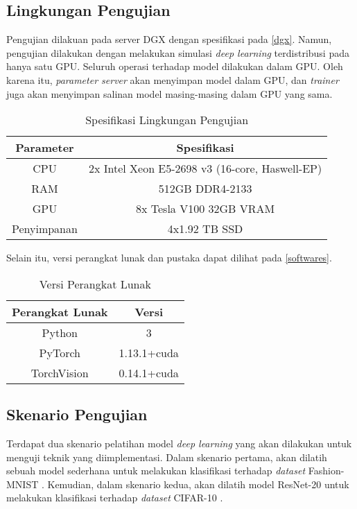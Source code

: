 \subsection{Lingkungan Pengujian}
Pengujian dilakuan pada server DGX dengan spesifikasi pada \autoref{dgx}. Namun, pengujian dilakukan dengan melakukan simulasi \emph{deep learning} terdistribusi pada hanya satu GPU. Seluruh operasi terhadap model dilakukan dalam GPU. Oleh karena itu, \emph{parameter server} akan menyimpan model dalam GPU, dan \emph{trainer} juga akan menyimpan salinan model masing-masing dalam GPU yang sama.

\begin{table}[H]
  \caption{Spesifikasi Lingkungan Pengujian}\label{dgx}
  \centering
  \begin{tabular}{ | c | c | }
    \hline
    \textbf{Parameter} & \textbf{Spesifikasi}                           \\
    \hline
    CPU                & 2x Intel Xeon E5-2698 v3 (16-core, Haswell-EP) \\
    \hline
    RAM                & 512GB DDR4-2133                                \\
    \hline
    GPU                & 8x Tesla V100 32GB VRAM                        \\
    \hline
    Penyimpanan        & 4x1.92 TB SSD                                  \\
    \hline
  \end{tabular}
\end{table}

Selain itu, versi perangkat lunak dan pustaka dapat dilihat pada \autoref{softwares}.
\begin{table}[H]
  \caption{Versi Perangkat Lunak}\label{softwares}
  \centering
  \begin{tabular}{ | c | c | }
    \hline
    \textbf{Perangkat Lunak} & \textbf{Versi} \\
    \hline
    Python                   & 3              \\
    \hline
    PyTorch                  & 1.13.1+cuda    \\
    \hline
    TorchVision              & 0.14.1+cuda    \\
    \hline
  \end{tabular}
\end{table}

\subsection{Skenario Pengujian}
Terdapat dua skenario pelatihan model \emph{deep learning} yang akan dilakukan untuk menguji teknik yang diimplementasi. Dalam skenario pertama, akan dilatih sebuah model sederhana untuk melakukan klasifikasi terhadap \emph{dataset} Fashion-MNIST \parencite{xiao2017fashion}. Kemudian, dalam skenario kedua, akan dilatih model ResNet-20 \parencite{he2015deep} untuk melakukan klasifikasi terhadap \emph{dataset} CIFAR-10 \parencite{krizhevsky2009cifar}.

